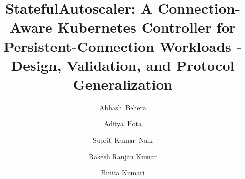 \documentclass[3p,twocolumn]{elsarticle}
\theoremstyle{plain}%
\theoremstyle{definition}%
\begin{document}
\begin{frontmatter}


\title{StatefulAutoscaler: A Connection-Aware Kubernetes Controller for
Persistent-Connection Workloads - Design, Validation, and Protocol
Generalization}


\author[1]{Abhash~Behera}
\address[1]{Department of Computer Science and Engineering, C V Raman Global University, Bhubaneswar, 752054, India}

\author[1]{Aditya~Hota}

\author[1]{Suprit~Kumar~Naik}

\author[1]{Rakesh Ranjan Kumar}
\author[1]{Binita Kumari}

\begin{abstract}


\end{abstract}
\end{frontmatter}
\end{document}
